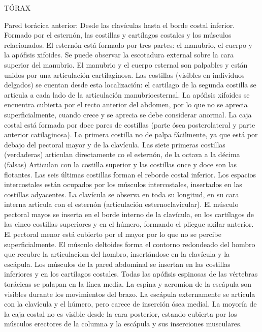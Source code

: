 \documentclass[a4paper,12pt]{article} %
\begin{document}
TÓRAX

Pared torácica anterior: Desde las clavículas hasta el borde costal inferior. Formado por el esternón, las costillas y cartílagos costales y los músculos relacionados.
El esternón está formado por tres partes: el manubrio, el cuerpo y la apófisis xifoides. Se puede observar la escotadura external sobre la cara superior del manubrio. El manubrio y el cuerpo esternal son palpables y están unidos por una articulación cartilaginosa. Las costillas (visibles en individuos delgados) se cuentan desde esta localización: el cartilago de la segunda costilla se articula a cada lado de la articulación manubrioesternal. La apófisis xifoides se encuentra cubierta por el recto anterior del abdomen, por lo que no se aprecia superficialmente, cuando crece y se aprecia se debe considerar anormal.
La caja costal está formada por doce pares de costillas (parte ósea posterolateral y parte anterior catilaginosa). La primera costilla no de palpa fácilmente, ya que está por debajo del pectoral mayor y de la clavícula. Las siete primeras costillas (verdaderas) articulan directamente co el esternón, de la octava a la décima (falsas) Articulan con la costilla superior y las costillas once y doce son las flotantes. Las seis últimas costillas forman el reborde costal inferior. Los espacios intercostales están ocupados por los músculos intercostales, insertados en las costillas adyacentes.
La clavícula se observa en toda su longitud, en su cara interna articula con  el esternón (articulación esternoclavicular).
El músculo pectoral mayos se inserta en el borde interno de la clavícula, en los cartílagos de las cinco costillas superiores y en el húmero, formando el pliegue axilar anterior. El pectoral menor está cubierto por el mayor por lo que no se percibe superficialmente.
El músculo deltoides forma el contorno redondeado del hombro que recubre la articulaciom del hombro, insertándose en la clavícula y la escápula.
Los músculos de la pared abdominal se insertan en las costillas inferiores y en los cartílagos costales.
Todas las apófisis espinosas de las vértebras torácicas se palapan en la línea media. La espina y acromion de la escápula son visibles durante los movimientos del brazo. La escápula externamente se articula con la clavícula y el húmero, pero carece de inserción ósea medial. La moyoría de la caja costal no es visible desde la cara posterior, estando cubierta por los músculos erectores de la columna y la escápula y sus inserciones musculares.
\end{document}
